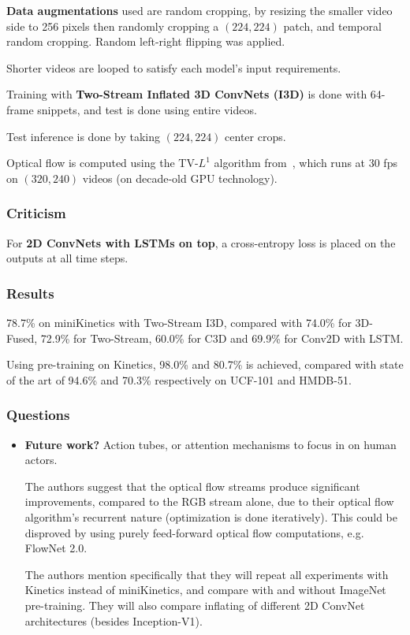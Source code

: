 \documentclass[a4paper, 12pt]{article}
\begin{document}
\textbf{Data augmentations} used are random cropping, by resizing the smaller
video side to 256 pixels then randomly cropping a $(224, 224)$ patch, and
temporal random cropping. Random left-right flipping was applied.

Shorter videos are looped to satisfy each model's input requirements.

Training with \textbf{Two-Stream Inflated 3D ConvNets (I3D)} is done with
64-frame snippets, and test is done using entire videos.

Test inference is done by taking $(224, 224)$ center crops.

Optical flow is computed using the TV-$L^1$ algorithm
from~\cite{Zach07aduality}, which runs at 30 fps on $(320, 240)$ videos (on
decade-old GPU technology).

\subsubsection{Criticism}

For \textbf{2D ConvNets with LSTMs on top}, a cross-entropy loss is placed on
the outputs at all time steps.

\subsubsection{Results}

78.7\% on miniKinetics with Two-Stream I3D, compared with 74.0\% for 3D-Fused,
72.9\% for Two-Stream, 60.0\% for C3D and 69.9\% for Conv2D with LSTM\@.

Using pre-training on Kinetics, 98.0\% and 80.7\% is achieved, compared with
state of the art of 94.6\% and 70.3\% respectively on UCF-101 and HMDB-51.


\subsubsection{Questions}

\begin{itemize}
        \item \textbf{Future work?} Action tubes, or attention mechanisms to
                focus in on human actors.

                The authors suggest that the optical flow streams produce
                significant improvements, compared to the RGB stream alone, due
                to their optical flow algorithm's recurrent nature
                (optimization is done iteratively).  This could be disproved by
                using purely feed-forward optical flow computations, e.g.
                FlowNet 2.0.

                The authors mention specifically that they will repeat all
                experiments with Kinetics instead of miniKinetics, and compare
                with and without ImageNet pre-training. They will also compare
                inflating of different 2D ConvNet architectures (besides
                Inception-V1).
\end{itemize}
\end{document}
